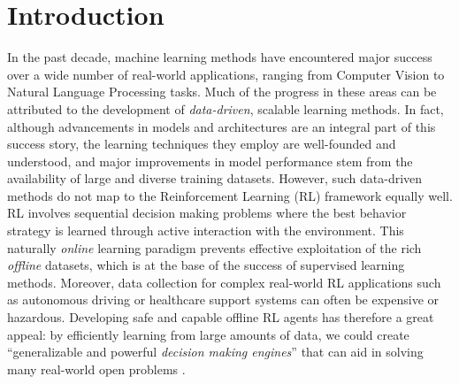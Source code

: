 \section{Introduction}\label{sec:introduction}
In the past decade, machine learning methods have encountered
major success over a wide number of real-world applications, ranging
from Computer Vision to Natural Language Processing tasks.
Much of the progress in these areas can be attributed to the
development of \textit{data-driven}, scalable learning methods. In
fact, although advancements in models and architectures are an integral
part of this success story, the learning techniques they employ are
well-founded and understood, and major improvements in model
performance stem from the availability of large and diverse training
datasets.
However, such data-driven methods do not map to the Reinforcement
Learning (RL) framework equally well. RL involves sequential decision
making problems where the best behavior strategy is learned through
active interaction with the environment. This naturally
\textit{online} learning paradigm prevents effective exploitation of
the rich \textit{offline} datasets, which is at the base of the
success of supervised learning methods.
Moreover, data collection for complex real-world RL applications such as
autonomous driving or healthcare support systems can often be
expensive or hazardous. Developing safe and capable
offline RL agents has therefore a great appeal: by efficiently
learning from large amounts of data, we could create ``generalizable
and powerful \textit{decision making engines}''
\citep{levine2020offline} that can aid in solving many real-world open
problems \citep{levine2020offline}.

